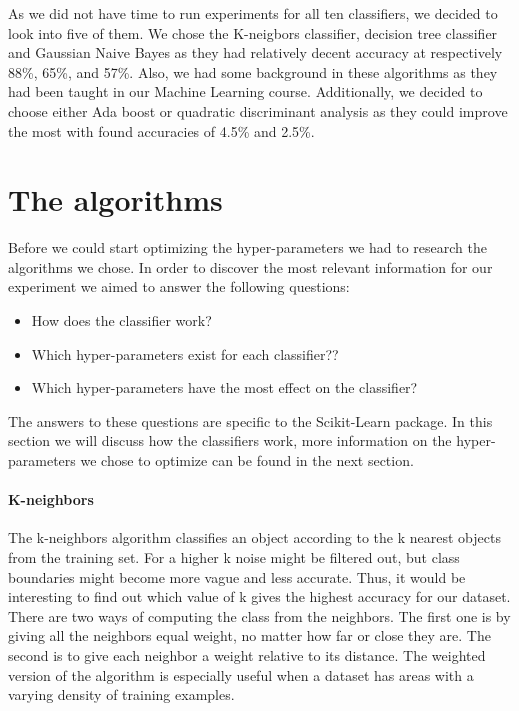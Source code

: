 \documentclass{article}
\begin{document}
	As we did not have time to run experiments for all ten classifiers, we decided to look into five of them. We chose the K-neigbors classifier, decision tree classifier and Gaussian Naive Bayes as they had relatively decent accuracy at respectively 88\%, 65\%, and 57\%. Also, we had some background in these algorithms as they had been taught in our Machine Learning course. Additionally, we decided to choose either Ada boost or quadratic discriminant analysis as they could improve the most with found accuracies of 4.5\% and 2.5\%. 

\newpage
\section{The algorithms}
	Before we could start optimizing the hyper-parameters we had to research the algorithms we chose. In order to discover the most relevant information for our experiment we aimed to answer the following questions:
	
	\begin{itemize}
		\item How does the classifier work? 
		\item Which hyper-parameters exist for each classifier??
		\item Which hyper-parameters have the most effect on the classifier?
	\end{itemize}
	
	The answers to these questions are specific to the Scikit-Learn package. In this section we will discuss how the classifiers work, more information on the hyper-parameters we chose to optimize can be found in the next section.
	
	\paragraph{K-neighbors}
		The k-neighbors algorithm classifies an object according to the k nearest objects from the training set. For a higher k noise might be filtered out, but class boundaries might become more vague and less accurate. Thus, it would be interesting to find out which value of k gives the highest accuracy for our dataset. There are two ways of computing the class from the neighbors. The first one is by giving all the neighbors equal weight, no matter how far or close they are.  The second is to give each neighbor a weight relative to its distance. The weighted version of the algorithm is especially useful when a dataset has areas with a varying density of training examples. 
	
\end{document}
